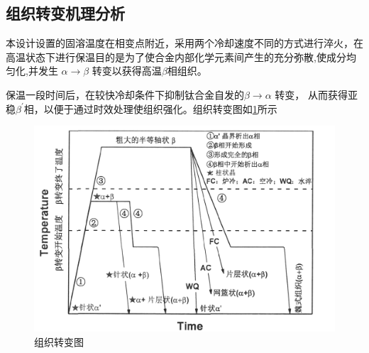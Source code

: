 \subsection{组织转变机理分析}
本设计设置的固溶温度在相变点附近，采用两个冷却速度不同的方式进行淬火，在高温状态下进行保温目的是为了使合金内部化学元素间产生的充分弥散,使成分均匀化,并发生 $\alpha\to\beta$ 转变以获得高温$ \beta $相组织。


保温一段时间后，在较快冷却条件下抑制钛合金自发的$\beta\to \alpha$ 转变， 从而获得亚稳$ \beta^{\prime} $相，以便于通过时效处理使组织强化。组织转变图如\ref{fig: micchange}所示\cite{YangJingJingJiGuangXuanQuRongHuaChengXingTi6Al4VHeJinDeZuZhiYanBianJiDiaoKong2017a}


\begin{figure}[h!]
	\centering
	\includegraphics[width=0.7\linewidth]{pic/组织转变图}
	\caption{组织转变图}
	\label{fig: micchange}
\end{figure}




